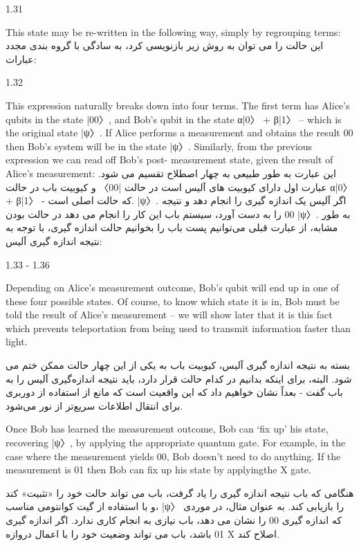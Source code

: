 \documentclass{book}
\begin{document}
1.31


This state may be re-written in the following way, simply by regrouping terms:
این حالت را می توان به روش زیر بازنویسی کرد، به سادگی با گروه بندی مجدد عبارات:

1.32


This expression naturally breaks down into four terms. The first term has Alice’s qubits
in the state |00〉, and Bob’s qubit in the state α|0〉 + β|1〉 – which is the original state
|ψ〉. If Alice performs a measurement and obtains the result 00 then Bob’s system will
be in the state |ψ〉. Similarly, from the previous expression we can read off Bob’s post-
measurement state, given the result of Alice’s measurement:
این عبارت به طور طبیعی به چهار اصطلاح تقسیم می شود. عبارت اول دارای کیوبیت های آلیس است
در حالت |00〉 و کیوبیت باب در حالت α|0〉 + β|1〉 - که حالت اصلی است.
|ψ〉. اگر آلیس یک اندازه گیری را انجام دهد و نتیجه 00 را به دست آورد، سیستم باب این کار را انجام می دهد
در حالت بودن |ψ〉. به طور مشابه، از عبارت قبلی می‌توانیم پست باب را بخوانیم
حالت اندازه گیری، با توجه به نتیجه اندازه گیری آلیس:



1.33 - 1.36


Depending on Alice’s measurement outcome, Bob’s qubit will end up in one of these four possible states. Of course, to know which state it is in, Bob must be told the result of Alice’s measurement – we will show later that it is this fact which prevents teleportation from being used to transmit information faster than light.

بسته به نتیجه اندازه گیری آلیس، کیوبیت باب به یکی از این چهار حالت ممکن ختم می شود. البته، برای اینکه بدانیم در کدام حالت قرار دارد، باید نتیجه اندازه‌گیری آلیس را به باب گفت - بعداً نشان خواهیم داد که این واقعیت است که مانع از استفاده از دوربری برای انتقال اطلاعات سریع‌تر از نور می‌شود.


 Once Bob has learned the measurement outcome, Bob can ‘fix up’ his state, recovering |ψ〉, by applying the appropriate quantum gate. For example, in the case where the measurement yields 00, Bob doesn’t need to do anything. If the measurement is 01 then Bob can fix up his state by applyingthe X gate. 


هنگامی که باب نتیجه اندازه گیری را یاد گرفت، باب می تواند حالت خود را «تثبیت» کند و با استفاده از گیت کوانتومی مناسب، |ψ〉 را بازیابی کند. به عنوان مثال، در موردی که اندازه گیری 00 را نشان می دهد، باب نیازی به انجام کاری ندارد. اگر اندازه گیری 01 باشد، باب می تواند وضعیت خود را با اعمال دروازه X اصلاح کند.
\end{document}
